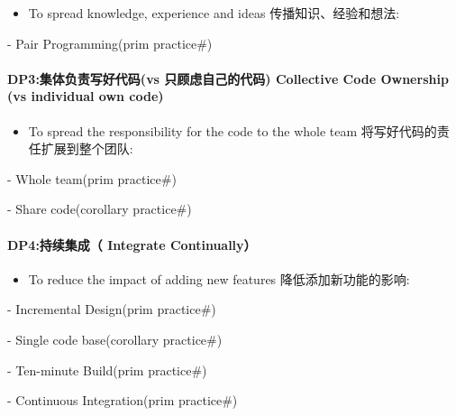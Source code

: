 \begin{itemize}
\tightlist
\item
  To spread knowledge, experience and ideas 传播知识、经验和想法:\\
\end{itemize}

\begin{description}
\tightlist
\item[]
- Pair Programming(prim practice\#)
\end{description}

\hypertarget{dp3ux96c6ux4f53ux8d1fux8d23ux5199ux597dux4ee3ux7801vs-ux53eaux987eux8651ux81eaux5df1ux7684ux4ee3ux7801-collective-code-ownership-vs-individual-own-code}{%
\paragraph{DP3:集体负责写好代码(vs 只顾虑自己的代码) Collective Code
Ownership (vs individual own
code)}\label{dp3ux96c6ux4f53ux8d1fux8d23ux5199ux597dux4ee3ux7801vs-ux53eaux987eux8651ux81eaux5df1ux7684ux4ee3ux7801-collective-code-ownership-vs-individual-own-code}}

\begin{itemize}
\tightlist
\item
  To spread the responsibility for the code to the whole team
  将写好代码的责任扩展到整个团队:\\
\end{itemize}

\begin{description}
\tightlist
\item[]
- Whole team(prim practice\#)

- Share code(corollary practice\#)
\end{description}

\hypertarget{dp4ux6301ux7eedux96c6ux6210-integrate-continually}{%
\paragraph{DP4:持续集成（ Integrate
Continually）}\label{dp4ux6301ux7eedux96c6ux6210-integrate-continually}}

\begin{itemize}
\tightlist
\item
  To reduce the impact of adding new features 降低添加新功能的影响:
\end{itemize}

\begin{description}
\tightlist
\item[]
- Incremental Design(prim practice\#)

- Single code base(corollary practice\#)

- Ten-minute Build(prim practice\#)

- Continuous Integration(prim practice\#)
\end{description}


